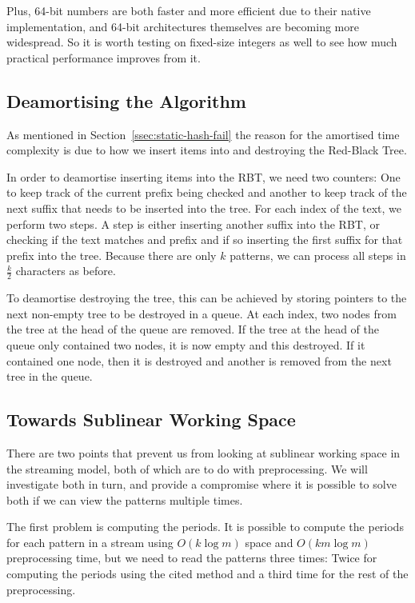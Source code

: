 \documentclass[ %
                    author={Dominic Joseph Moylett},
                    degree={MEng},
                     title={Dictionary Matching with Fingerprints},
                  subtitle={An Empirical Analysis},
                      type={research},
                      year={2015} ]{dissertation}
\begin{document}
Plus, 64-bit numbers are both faster and more efficient due to their native implementation, and 64-bit architectures themselves are becoming more widespread. So it is worth testing on fixed-size integers as well to see how much practical performance improves from it.

\subsection{Deamortising the Algorithm}
\label{ssec:deamortise}

As mentioned in Section~\ref{ssec:static-hash-fail} the reason for the amortised time complexity is due to how we insert items into and destroying the Red-Black Tree.

In order to deamortise inserting items into the RBT, we need two counters: One to keep track of the current prefix being checked and another to keep track of the next suffix that needs to be inserted into the tree. For each index of the text, we perform two steps. A step is either inserting another suffix into the RBT, or checking if the text matches and prefix and if so inserting the first suffix for that prefix into the tree. Because there are only $k$ patterns, we can process all steps in $\frac{k}{2}$ characters as before.

To deamortise destroying the tree, this can be achieved by storing pointers to the next non-empty tree to be destroyed in a queue. At each index, two nodes from the tree at the head of the queue are removed. If the tree at the head of the queue only contained two nodes, it is now empty and this destroyed. If it contained one node, then it is destroyed and another is removed from the next tree in the queue.

\subsection{Towards Sublinear Working Space}

There are two points that prevent us from looking at sublinear working space in the streaming model, both of which are to do with preprocessing. We will investigate both in turn, and provide a compromise where it is possible to solve both if we can view the patterns multiple times.

The first problem is computing the periods. It is possible to compute the periods for each pattern in a stream \cite{ergun:sublinear-period} using $O(k\log m)$ space and $O(km\log m)$ preprocessing time, but we need to read the patterns three times: Twice for computing the periods using the cited method and a third time for the rest of the preprocessing.
\end{document}
